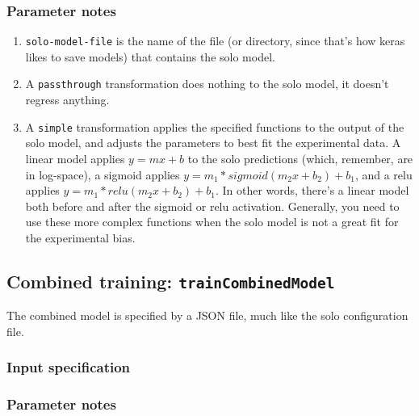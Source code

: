 \documentclass{article}
\begin{document}
\subsubsection{Parameter notes}

\begin{enumerate}
    \item \texttt{solo-model-file} is the name of the file (or directory, since
        that's how keras likes to save models) that contains the solo model.
    \item A \texttt{passthrough} transformation does nothing to the solo model,
        it doesn't regress anything.
    \item A \texttt{simple} transformation applies the specified functions to
        the output of the solo model, and adjusts the parameters to best fit the
        experimental data.
        A linear model applies $y=m x+b$ to the solo predictions (which,
        remember, are in log-space),
        a sigmoid applies $y = m_1 *sigmoid(m_2x+b_2) + b_1$,
        and a relu applies $y = m_1 * relu(m_2x+b_2) + b_1$.
        In other words, there's a linear model both before and after the sigmoid
        or relu activation.
        Generally, you need to use these more complex functions when the solo
        model is not a great fit for the experimental bias.
\end{enumerate}



\newpage

\subsection{Combined training: \texttt{trainCombinedModel}}\label{prog:trainCombinedModel}

The combined model is specified by a JSON file, much like the solo configuration
file.

\subsubsection{Input specification}



\subsubsection{Parameter notes}
\end{document}
